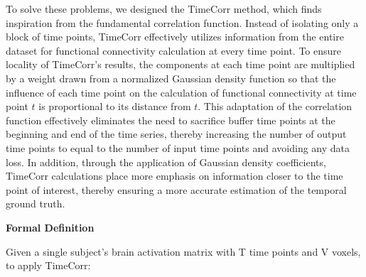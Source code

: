 \documentclass[11pt]{article}
\begin{document}
To solve these problems, we designed the TimeCorr method, which finds inspiration from the fundamental correlation function. Instead of isolating only a block of time points, TimeCorr effectively utilizes information from the entire dataset for functional connectivity calculation at every time point. To ensure locality of TimeCorr's results, the components at each time point are multiplied by a weight drawn from a normalized Gaussian density function so that the influence of each time point on the calculation of functional connectivity at time point $t$ is proportional to its distance from $t$. This adaptation of the correlation function effectively eliminates the need to sacrifice buffer time points at the beginning and end of the time series, thereby increasing the number of output time points to equal to the number of input time points and avoiding any data loss. In addition, through the application of Gaussian density coefficients, TimeCorr calculations place more emphasis on information closer to the time point of interest, thereby ensuring a more accurate estimation of the temporal ground truth.

\large{\textbf{Formal Definition}}

\normalsize
Given a single subject's brain activation matrix with T time points and V voxels, to apply TimeCorr:
\end{document}
